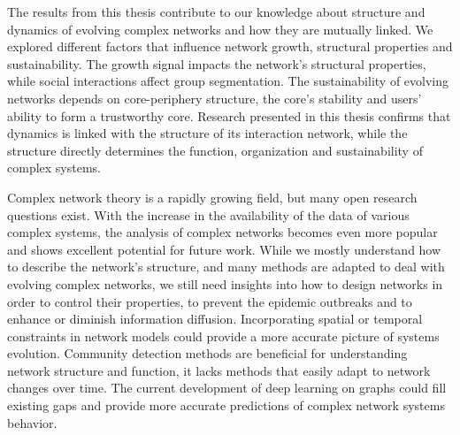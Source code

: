 The results from this thesis contribute to our knowledge about structure and dynamics of evolving complex networks and how they are mutually linked. We explored different factors that influence network growth, structural properties and sustainability. The growth signal impacts the network's structural properties, while social interactions affect group segmentation. The sustainability of evolving networks depends on core-periphery structure, the core's stability and users' ability to form a trustworthy core. Research presented in this thesis confirms that dynamics is linked with the structure of its interaction network, while the structure directly determines the function, organization and sustainability of complex systems.  




Complex network theory is a rapidly growing field, but many open research questions exist. With the increase in the availability of the data of various complex systems, the analysis of complex networks becomes even more popular and shows excellent potential for future work. While we mostly understand how to describe the network's structure, and many methods are adapted to deal with evolving complex networks, we still need insights into how to design networks in order to control their properties, to prevent the epidemic outbreaks and to enhance or diminish information diffusion. Incorporating spatial or temporal constraints in network models could provide a more accurate picture of systems evolution. Community detection methods are beneficial for understanding network structure and function, it lacks methods that easily adapt to network changes over time. The current development of deep learning on graphs could fill existing gaps and provide more accurate predictions of complex network systems behavior.

\sffamily
{}\selectfont


	

